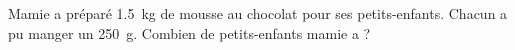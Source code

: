 
\begin{exercice}\label{exo2smath-0033}

    Mamie a préparé \SI{1.5}{\kilo\gram} de mousse au chocolat pour ses petits-enfants. Chacun a pu manger un \SI{250}{\gram}. Combien de petits-enfants mamie a ?

\end{exercice}
